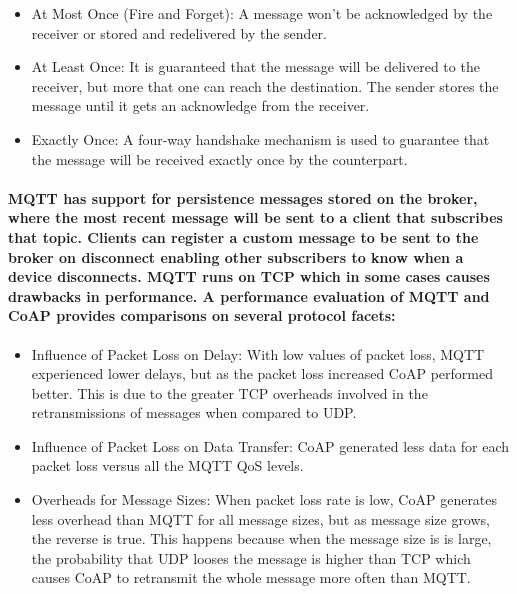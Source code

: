 \begin{itemize}
	\item At Most Once (Fire and Forget): A message won't be acknowledged by the receiver or stored and redelivered by the sender.\\
	\item At Least Once: It is guaranteed that the message will be delivered to the receiver, but more that one can reach the destination. The sender stores the message until it gets an acknowledge from the receiver.\\
	\item Exactly Once: A four-way handshake mechanism is used to guarantee that the message will be received exactly once by the counterpart.
\end{itemize}

\paragraph{\ac{MQTT} has support for persistence messages stored on the broker, where the most recent message will be sent to a client that subscribes that topic. Clients can register a custom message to be sent to the broker on disconnect enabling other subscribers to know when a device disconnects. \ac{MQTT} runs on \ac{TCP} which in some cases causes drawbacks in performance. A performance evaluation of \ac{MQTT} and \ac{CoAP} \cite{Ma2014} provides comparisons on several protocol facets:
}

\begin{itemize}
	\item Influence of Packet Loss on Delay: With low values of packet loss, \ac{MQTT} experienced lower delays, but as the packet loss increased \ac{CoAP} performed better. This is due to the greater \ac{TCP} overheads involved in the retransmissions of messages when compared to \ac{UDP}.\\
	\item Influence of Packet Loss on Data Transfer: \ac{CoAP} generated less data for each packet loss versus all the \ac{MQTT} \ac{QoS} levels.\\
	\item Overheads for Message Sizes: When packet loss rate is low, \ac{CoAP} generates less overhead than \ac{MQTT} for all message sizes, but as message size grows, the reverse is true. This happens because when the message size is is large, the probability that \ac{UDP} looses the message is higher than \ac{TCP} which causes \ac{CoAP} to retransmit the whole message more often than \ac{MQTT}.
\end{itemize}

